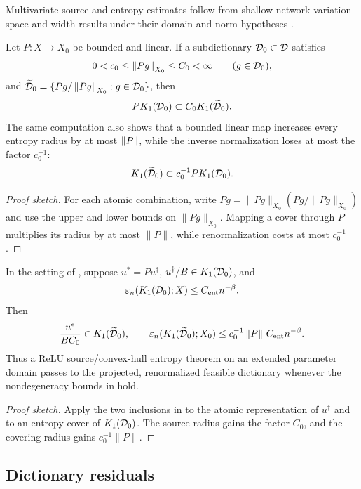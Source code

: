 Multivariate source and entropy estimates follow from shallow-network variation-space and width results under their domain and norm hypotheses \citep{SiegelXuVariation2023,SiegelXuSharp2024,MaoSiegelXu2026}.

\begin{lemma}
\label{lem:projection}
Let \(P:X\to X_0\) be bounded and linear. If a subdictionary \(\mathcal{D}_0\subset\mathcal{D}\) satisfies
\[
 0<c_0\leq\left\lVert Pg\right\rVert_{X_0}\leq C_0<\infty\qquad(g\in\mathcal{D}_0),
\]
and \(\widetilde{\mathcal{D}}_0=\{Pg/\left\lVert Pg\right\rVert_{X_0}:g\in\mathcal{D}_0\}\), then
\[
 P K_1(\mathcal{D}_0)\subset C_0K_1(\widetilde{\mathcal{D}}_0).
\]
The same computation also shows that a bounded linear map increases every entropy radius by at most
\(\left\lVert P\right\rVert\), while the inverse normalization loses at most the factor \(c_0^{-1}\):
\[
 K_1(\widetilde{\mathcal{D}}_0)\subset c_0^{-1}P K_1(\mathcal{D}_0).
\]
\end{lemma}

\begin{proof}[Proof sketch]
For each atomic combination, write $Pg=\|Pg\|_{X_0}(Pg/\|Pg\|_{X_0})$ and use the upper and lower bounds on $\|Pg\|_{X_0}$.  Mapping a cover through $P$ multiplies its radius by at most $\|P\|$, while renormalization costs at most $c_0^{-1}$.
\end{proof}

\begin{corollary}
\label{cor:projected-source-entropy}
In the setting of , suppose \(u^*=Pu^\dagger\),
\(u^\dagger/B\in K_1(\mathcal{D}_0)\), and
\[
 \varepsilon_n(K_1(\mathcal{D}_0);X)\leq C_{\rm ent}n^{-\beta}.
\]
Then
\[
 \frac{u^*}{BC_0}\in K_1(\widetilde{\mathcal{D}}_0),
 \qquad
 \varepsilon_n(K_1(\widetilde{\mathcal{D}}_0);X_0)
 \leq c_0^{-1}\left\lVert P\right\rVert\,C_{\rm ent}n^{-\beta}.
\]
Thus a ReLU source/convex-hull entropy theorem on an extended parameter domain passes to the projected,
renormalized feasible dictionary whenever the nondegeneracy bounds in  hold.
\end{corollary}

\begin{proof}[Proof sketch]
Apply the two inclusions in  to the atomic representation of $u^\dagger$ and to an entropy cover of $K_1(\mathcal{D}_0)$.  The source radius gains the factor $C_0$, and the covering radius gains $c_0^{-1}\|P\|$.
\end{proof}

\subsection{Dictionary residuals}


